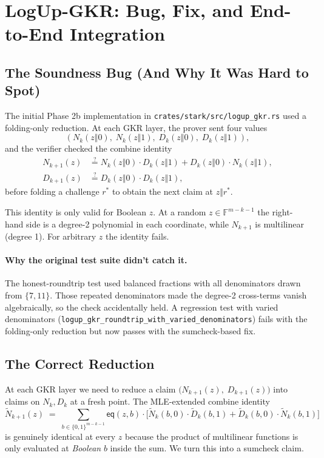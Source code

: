 \section{LogUp-GKR: Bug, Fix, and End-to-End Integration}
\label{sec:logup-gkr-fix}

\subsection{The Soundness Bug (And Why It Was Hard to Spot)}

The initial Phase 2b implementation in
\texttt{crates/stark/src/logup\_gkr.rs} used a folding-only reduction.
At each GKR layer, the prover sent four values
\[
  (N_k(z \Vert 0),\; N_k(z \Vert 1),\; D_k(z \Vert 0),\; D_k(z \Vert 1)),
\]
and the verifier checked the combine identity
\begin{align*}
  N_{k+1}(z) &\stackrel{?}{=} N_k(z \Vert 0) \cdot D_k(z \Vert 1) + D_k(z \Vert 0) \cdot N_k(z \Vert 1), \\
  D_{k+1}(z) &\stackrel{?}{=} D_k(z \Vert 0) \cdot D_k(z \Vert 1),
\end{align*}
before folding a challenge $r^*$ to obtain the next claim at $z \Vert r^*$.

This identity is only valid for Boolean $z$. At a random $z \in \mathbb{F}^{m-k-1}$
the right-hand side is a degree-2 polynomial in each coordinate, while
$N_{k+1}$ is multilinear (degree 1). For arbitrary $z$ the identity fails.

\paragraph{Why the original test suite didn't catch it.}
The honest-roundtrip test used balanced fractions with all denominators
drawn from $\{7, 11\}$. Those repeated denominators made the degree-2
cross-terms vanish algebraically, so the check accidentally held. A
regression test with varied denominators
(\texttt{logup\_gkr\_roundtrip\_with\_varied\_denominators}) fails with
the folding-only reduction but now passes with the sumcheck-based fix.

\subsection{The Correct Reduction}

At each GKR layer we need to reduce a claim
$\bigl(N_{k+1}(z),\; D_{k+1}(z)\bigr)$ into claims on $N_k, D_k$ at a
fresh point. The MLE-extended combine identity
\[
  \widetilde{N}_{k+1}(z)
   \;=\; \sum_{b \in \{0,1\}^{m-k-1}} \mathsf{eq}(z, b) \cdot
         \bigl[\widetilde{N}_k(b, 0) \cdot \widetilde{D}_k(b, 1)
               + \widetilde{D}_k(b, 0) \cdot \widetilde{N}_k(b, 1)\bigr]
\]
is genuinely identical at every $z$ because the product of multilinear
functions is only evaluated at \emph{Boolean} $b$ inside the sum. We
turn this into a sumcheck claim.

